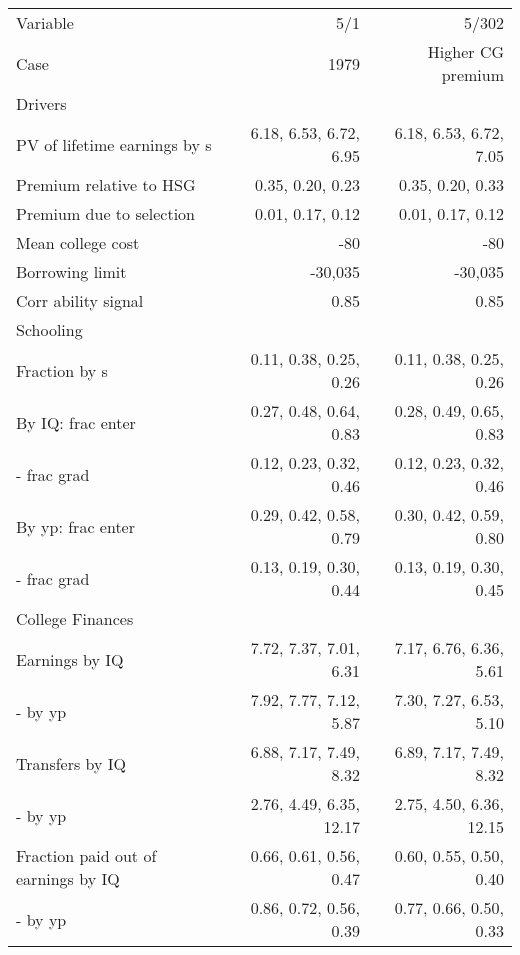 \begin{tabular}{lrr}
\hline
Variable & 5/1  & 5/302  \\ 
Case & 1979  & Higher CG premium  \\ 
Drivers &   &   \\ 
PV of lifetime earnings by s & 6.18, 6.53, 6.72, 6.95  & 6.18, 6.53, 6.72, 7.05  \\ 
Premium relative to HSG & 0.35, 0.20, 0.23  & 0.35, 0.20, 0.33  \\ 
Premium due to selection & 0.01, 0.17, 0.12  & 0.01, 0.17, 0.12  \\ 
Mean college cost & -80  & -80  \\ 
Borrowing limit & -30,035  & -30,035  \\ 
Corr ability signal & 0.85  & 0.85  \\ 
\hline
Schooling &   &   \\ 
Fraction by s & 0.11, 0.38, 0.25, 0.26  & 0.11, 0.38, 0.25, 0.26  \\ 
By IQ: frac enter & 0.27, 0.48, 0.64, 0.83  & 0.28, 0.49, 0.65, 0.83  \\ 
- frac grad & 0.12, 0.23, 0.32, 0.46  & 0.12, 0.23, 0.32, 0.46  \\ 
By yp: frac enter & 0.29, 0.42, 0.58, 0.79  & 0.30, 0.42, 0.59, 0.80  \\ 
- frac grad & 0.13, 0.19, 0.30, 0.44  & 0.13, 0.19, 0.30, 0.45  \\ 
\hline
College Finances &   &   \\ 
Earnings by IQ & 7.72, 7.37, 7.01, 6.31  & 7.17, 6.76, 6.36, 5.61  \\ 
- by yp & 7.92, 7.77, 7.12, 5.87  & 7.30, 7.27, 6.53, 5.10  \\ 
Transfers by IQ & 6.88, 7.17, 7.49, 8.32  & 6.89, 7.17, 7.49, 8.32  \\ 
- by yp & 2.76, 4.49, 6.35, 12.17  & 2.75, 4.50, 6.36, 12.15  \\ 
Fraction paid out of earnings by IQ & 0.66, 0.61, 0.56, 0.47  & 0.60, 0.55, 0.50, 0.40  \\ 
- by yp & 0.86, 0.72, 0.56, 0.39  & 0.77, 0.66, 0.50, 0.33  \\ 
\hline
\end{tabular}%
